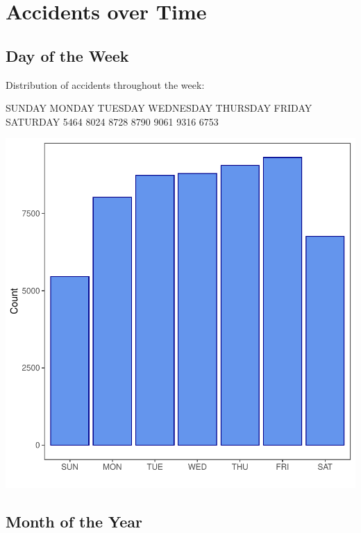 \documentclass[11pt, a4paper]{article}
\begin{document}
\pagebreak
\section{Accidents over Time}

\subsection{Day of the Week} 

Distribution of accidents throughout the week:

\begin{Schunk}
\begin{Soutput}
   SUNDAY    MONDAY   TUESDAY WEDNESDAY  THURSDAY    FRIDAY  SATURDAY 
     5464      8024      8728      8790      9061      9316      6753 
\end{Soutput}
\end{Schunk}
\includegraphics{variableinvestigation-003}


\pagebreak
\subsection{Month of the Year}
\end{document}
